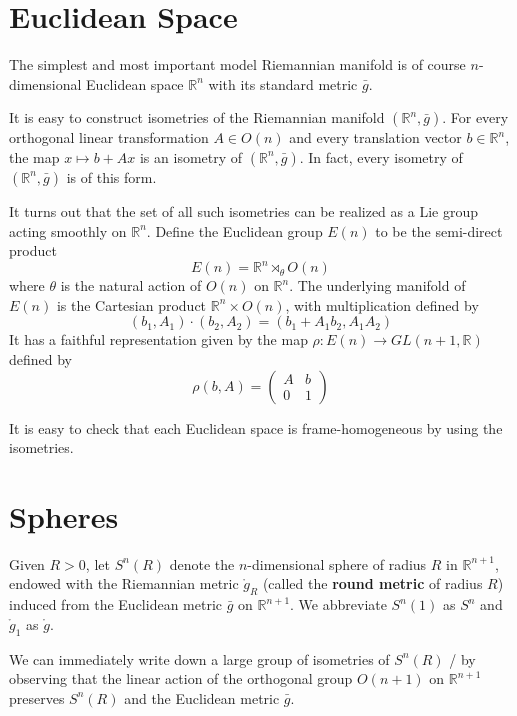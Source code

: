 \documentclass[../main.tex]{subfiles}
\begin{document}
\section{Euclidean Space}
The simplest and most important model Riemannian manifold is of course $n$-dimensional Euclidean space $\mathbb{R}^n$ with its standard metric $\bar{g}$.

It is easy to construct isometries of the Riemannian manifold $(\mathbb{R}^n, \bar{g})$. For every orthogonal linear transformation $A \in O(n)$ and every translation vector $b \in \mathbb{R}^n$, the map $x \mapsto b + Ax$ is an isometry of $(\mathbb{R}^n, \bar{g})$. In fact, every isometry of $(\mathbb{R}^n, \bar{g})$ is of this form.

It turns out that the set of all such isometries can be realized as a Lie group acting smoothly on $\mathbb{R}^n$. Define the Euclidean group $E(n)$ to be the semi-direct product
\begin{equation}
	E(n) = \mathbb{R}^n \rtimes_{\theta} O(n)
\end{equation}
where $\theta$ is the natural action of $O(n)$ on $\mathbb{R}^n$. The underlying manifold of $E(n)$ is the Cartesian product $\mathbb{R}^n \times O(n)$, with multiplication defined by
\begin{equation}
	(b_1, A_1) \cdot (b_2, A_2) = (b_1 + A_1 b_2, A_1 A_2)
\end{equation}
It has a faithful representation given by the map $\rho: E(n) \to GL(n+1, \mathbb{R})$ defined by
\begin{equation}
	\rho(b, A) = \begin{pmatrix}
		A & b \\
		0 & 1
	\end{pmatrix}
\end{equation}

It is easy to check that each Euclidean space is frame-homogeneous by using the isometries.

\section{Spheres}
Given $R > 0$, let $S^n(R)$ denote the $n$-dimensional sphere of radius $R$ in $\mathbb{R}^{n+1}$, endowed with the Riemannian metric $\mathring{g}_R$ (called the \textbf{round metric} of radius $R$) induced from the Euclidean metric $\bar{g}$ on $\mathbb{R}^{n+1}$. We abbreviate $S^n(1)$ as $S^n$ and $\mathring{g}_1$ as $\mathring{g}$.

We can immediately write down a large group of isometries of $S^n(R)$ / by observing that the linear action of the orthogonal group $O(n+1)$ on $\mathbb{R}^{n+1}$ preserves $S^n(R)$ and the Euclidean metric $\bar{g}$.
\end{document}
